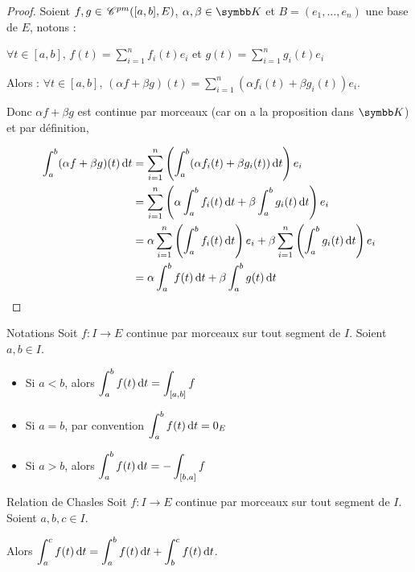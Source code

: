 \begin{proof}
    Soient $f,g \in \,\mathscr C^{pm}([a,b],E)$, $\alpha,\beta \in \K$ et $B = (e_1, \ldots, e_n)$ une base de $E$, notons :
    
    $\displaystyle \forall t \in [a, b], \, f(t) = \sum_{i=1}^n f_i(t)e_i$ et
    $\displaystyle g(t) = \sum_{i=1}^n g_i(t)e_i$
    
    Alors :
    $\displaystyle \forall t \in [a, b], \, (\alpha f + \beta g)(t) = \sum_{i=1}^n (\alpha f_i(t) + \beta g_i(t))e_i$.

    Donc $\alpha f + \beta g$ est continue par morceaux (car on a la proposition dans $\K$) et par définition,

    \begin{align*}
        \int_a^b (\alpha f + \beta g)(t) \,\mathrm{d}t & = \sum_{i=1}^n \left( \int_a^b (\alpha f_i(t) + \beta g_i(t)) \,\mathrm{d}t \right) e_i\\
        & = \sum_{i=1}^n \left( \alpha \int_a^b f_i(t) \,\mathrm{d}t + \beta \int_a^b g_i(t) \,\mathrm{d}t \right) e_i\\
        & = \alpha \sum_{i=1}^n \left( \int_a^b f_i(t) \,\mathrm{d}t \right) e_i + \beta \sum_{i=1}^n \left( \int_a^b g_i(t) \,\mathrm{d}t \right) e_i\\
        & = \alpha \int_a^b f(t) \,\mathrm{d}t + \beta \int_a^b g(t) \,\mathrm{d}t
    \end{align*}
\end{proof}

\begin{proposition}{Notations}{}
    Soit $f : I \to E$ continue par morceaux sur tout segment de $I$. Soient $a, b \in I$.
    \begin{itemize}
        \item Si $a < b$, alors $\displaystyle \int_a^b f(t) \,\mathrm{d}t = \int_{[a, b]} f$
        \item Si $a = b$, par convention $\displaystyle \int_a^b f(t) \,\mathrm{d}t = 0_E$
        \item Si $a > b$, alors $\displaystyle \int_a^b f(t) \,\mathrm{d}t = - \int_{[b, a]} f$
    \end{itemize}
\end{proposition}

\begin{proposition}{Relation de Chasles}{}
    Soit $f : I \to E$ continue par morceaux sur tout segment de $I$. Soient $a, b, c \in I$.

    Alors $\displaystyle \int_a^c f(t) \,\mathrm{d}t = \int_a^b f(t) \,\mathrm{d}t + \int_b^c f(t) \,\mathrm{d}t$.
\end{proposition}

